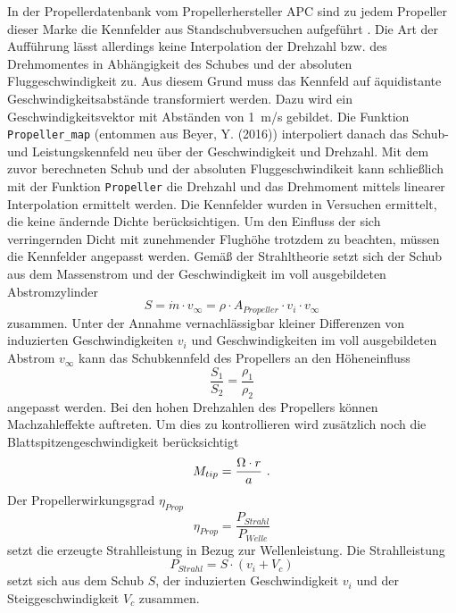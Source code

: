 In der Propellerdatenbank vom Propellerhersteller APC sind zu jedem Propeller dieser Marke die Kennfelder aus Standschubversuchen aufgeführt . Die Art der Aufführung lässt allerdings keine Interpolation der Drehzahl bzw. des Drehmomentes in Abhängigkeit des Schubes und der absoluten Fluggeschwindigkeit zu. Aus diesem Grund muss das Kennfeld auf äquidistante Geschwindigkeitsabstände transformiert werden. Dazu wird ein Geschwindigkeitsvektor mit Abständen von \SI{1}{m/s} gebildet. Die Funktion \texttt{Propeller\_map} (entommen aus Beyer, Y. (2016)) interpoliert danach das Schub- und Leistungskennfeld neu über der Geschwindigkeit und Drehzahl. Mit dem zuvor berechneten Schub und der absoluten Fluggeschwindikeit kann schließlich mit der Funktion \texttt{Propeller} die Drehzahl und das Drehmoment mittels linearer Interpolation ermittelt werden.
Die Kennfelder wurden in Versuchen ermittelt, die keine ändernde Dichte berücksichtigen. Um den Einfluss der sich verringernden Dicht mit zunehmender Flughöhe trotzdem zu beachten, müssen die Kennfelder angepasst werden. Gemäß der Strahltheorie setzt sich der Schub aus dem Massenstrom und der Geschwindigkeit im voll ausgebildeten Abstromzylinder 
\begin{equation}
	S =  \dot{m}\cdot v_{\infty} = \rho\cdot A_{Propeller}\cdot v_i\cdot v_{\infty}
	\label{eq:propellerschub}
\end{equation}
zusammen. Unter der Annahme vernachlässigbar kleiner Differenzen von  induzierten Geschwindigkeiten $v_i$ und Geschwindigkeiten im voll ausgebildeten Abstrom $v_{\infty}$ kann das Schubkennfeld des Propellers an den Höheneinfluss 
\begin{equation}
	\frac{S_1}{S_2} = \frac{\rho_1}{\rho_2}
\end{equation}
angepasst werden.
Bei den hohen Drehzahlen des Propellers können Machzahleffekte auftreten. Um dies zu kontrollieren wird zusätzlich noch die Blattspitzengeschwindigkeit berücksichtigt
\begin{equation}
	M_{tip} = \frac{\Omega\cdot r}{a} ~\text{.}
\end{equation}
Der Propellerwirkungsgrad \ensuremath{\eta_{Prop}} 
\begin{equation}
	\eta_{Prop} = \frac{P_{Strahl}}{P_{Welle}}
\end{equation}
setzt die erzeugte Strahlleistung in Bezug zur Wellenleistung.
Die Strahlleistung 
\begin{equation}
	P_{Strahl} = S\cdot (v_i + V_c)
	\label{eq:strahlleistung}
\end{equation}
setzt sich aus dem Schub \ensuremath{S}, der induzierten Geschwindigkeit \ensuremath{v_i} und der Steiggeschwindigkeit \ensuremath{V_c} zusammen. 

